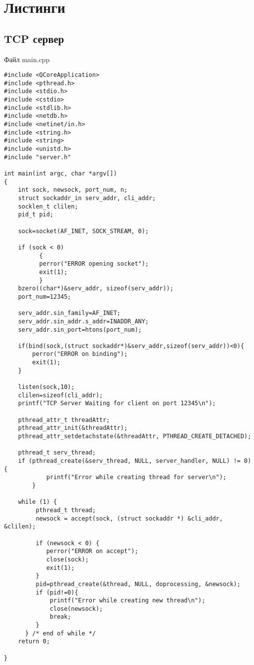 \documentclass[12pt,a4paper]{report}
\begin{document}
\section*{Листинги}
\subsection*{TCP сервер}
Файл main.cpp
\begin{lstlisting}
#include <QCoreApplication>
#include <pthread.h>
#include <stdio.h>
#include <cstdio>
#include <stdlib.h>
#include <netdb.h>
#include <netinet/in.h>
#include <string.h>
#include <string>
#include <unistd.h>
#include "server.h"

int main(int argc, char *argv[])
{
    int sock, newsock, port_num, n;
    struct sockaddr_in serv_addr, cli_addr;
    socklen_t clilen;
    pid_t pid;

    sock=socket(AF_INET, SOCK_STREAM, 0);

    if (sock < 0)
          {
          perror("ERROR opening socket");
          exit(1);
          }
    bzero((char*)&serv_addr, sizeof(serv_addr));
    port_num=12345;

    serv_addr.sin_family=AF_INET;
    serv_addr.sin_addr.s_addr=INADDR_ANY;
    serv_addr.sin_port=htons(port_num);

    if(bind(sock,(struct sockaddr*)&serv_addr,sizeof(serv_addr))<0){
        perror("ERROR on binding");
        exit(1);
    }

    listen(sock,10);
    clilen=sizeof(cli_addr);
    printf("TCP Server Waiting for client on port 12345\n");
    
    pthread_attr_t threadAttr;
    pthread_attr_init(&threadAttr);
    pthread_attr_setdetachstate(&threadAttr, PTHREAD_CREATE_DETACHED);
    
    pthread_t serv_thread;
    if (pthread_create(&serv_thread, NULL, server_handler, NULL) != 0) {
            printf("Error while creating thread for server\n");
        }

    while (1) {
         pthread_t thread;
         newsock = accept(sock, (struct sockaddr *) &cli_addr, &clilen);

         if (newsock < 0) {
            perror("ERROR on accept");
            close(sock);
            exit(1);
         }
         pid=pthread_create(&thread, NULL, doprocessing, &newsock);
         if (pid!=0){
             printf("Error while creating new thread\n");
             close(newsock);
             break;
         }
      } /* end of while */
    return 0;

}
\end{lstlisting}
\end{document}
